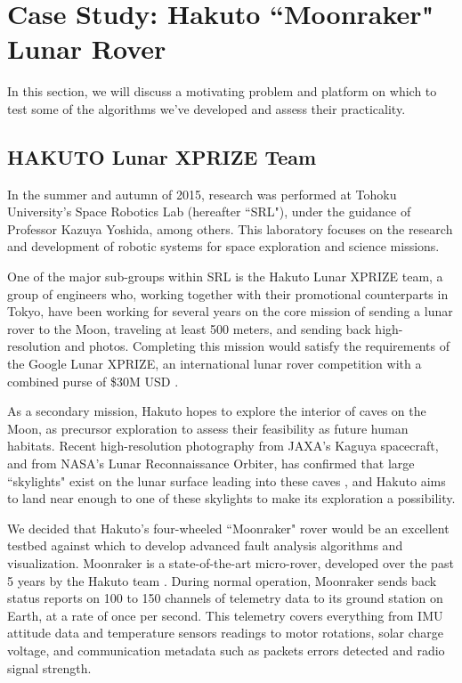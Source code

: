\chapter{Case Study: Hakuto ``Moonraker" Lunar Rover}

In this section, we will discuss a motivating problem and platform on which to test some of the algorithms we've developed and assess their practicality.

\section{HAKUTO Lunar XPRIZE Team}

In the summer and autumn of 2015, research was performed at Tohoku University's Space Robotics Lab (hereafter ``SRL"), under the guidance of Professor Kazuya Yoshida, among others. This laboratory focuses on the research and development of robotic systems for space exploration and science missions.

One of the major sub-groups within SRL is the Hakuto Lunar XPRIZE team, a group of engineers who, working together with their promotional counterparts in Tokyo, have been working for several years on the core mission of sending a lunar rover to the Moon, traveling at least 500 meters, and sending back high-resolution and photos. Completing this mission would satisfy the requirements of the Google Lunar XPRIZE, an international lunar rover competition with a combined purse of \$30M USD \cite{xprize}.

As a secondary mission, Hakuto hopes to explore the interior of caves on the Moon, as precursor exploration to assess their feasibility as future human habitats. Recent high-resolution photography from JAXA's Kaguya spacecraft, and from NASA's Lunar Reconnaissance Orbiter, has confirmed that large ``skylights" exist on the lunar surface leading into these caves \cite{rabbithole}, and Hakuto aims to land near enough to one of these skylights to make its exploration a possibility.

We decided that Hakuto's four-wheeled ``Moonraker" rover would be an excellent testbed against which to develop advanced fault analysis algorithms and visualization. Moonraker is a state-of-the-art micro-rover, developed over the past 5 years by the Hakuto team \cite{walker2015update}. During normal operation, Moonraker sends back status reports on 100 to 150 channels of telemetry data to its ground station on Earth, at a rate of once per second. This telemetry covers everything from IMU attitude data and temperature sensors readings to motor rotations, solar charge voltage, and communication metadata such as packets errors detected and radio signal strength.

